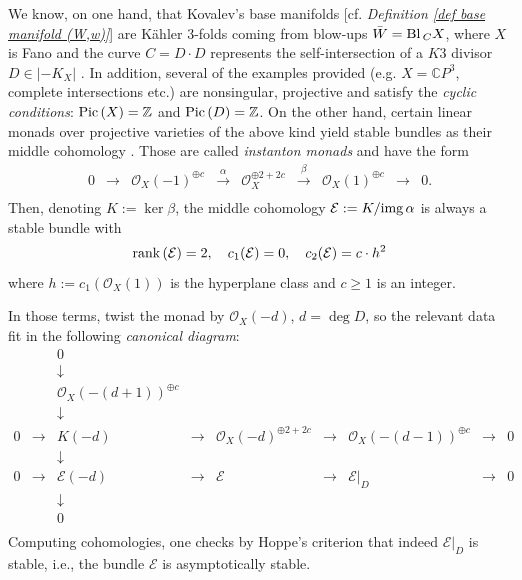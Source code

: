 \documentclass{article}
\newcommand{\func}[1]{\textnormal {#1\,}}
\newcommand{\oo}{\mathcal{O}_X}
\newcommand{\pic}{\func{Pic}}
\newcommand{\rank}{\func{rank}}
\newcommand{\img}{\func{img}}
\newcommand{\mc}[1]{\mathcal{#1}}
\begin{document}
We know, on one hand, that Kovalev's base manifolds [cf. \emph{Definition \ref{def base manifold (W,w)}}] are K\"ahler 3-folds
coming from blow-ups $\bar W=\func{Bl}_C X$, where $X$ is Fano and the curve $C=D\cdot D$ represents the self-intersection of a $K3$ divisor $D\in\left\vert -K_X \right\vert$ \cite[6.43]{kovalevzao}. In addition, several of the examples provided (e.g. $X=\mathbb{C}P^3$, complete intersections etc.) are nonsingular, projective and satisfy the \emph{cyclic conditions}: $\pic(X)=\mathbb{Z}$ and $\pic(D)=\mathbb{Z}$. 
On the other hand, certain linear monads over projective varieties of the above kind yield stable bundles as their middle cohomology \cite{Jardim Bull Braz}. Those are called \emph{instanton monads} and have the form
\begin{equation}        \label{eq instanton monad}
\begin{array}{ccccccccc}
0 & \rightarrow & \oo\left(-1\right)^{\oplus c} & \overset{\alpha}{\longrightarrow} & \oo^{\oplus2+2c} & \overset{\beta}{\longrightarrow} & \oo\left(1\right)^{\oplus c} & \rightarrow & 0.\\
\end{array}
\end{equation} Then,  denoting $K:=\ker\beta$,  the middle cohomology $\mc{E}:= K/\img \alpha$ is always a stable bundle with
        \begin{displaymath}
                \rank(\mc{E})=2,\quad c_1(\mc{E})=0, 
                \quad c_2(\mc{E})=c\cdot h^2
        \end{displaymath} 
where  $h:= c_1(\oo(1))$ is the hyperplane class and $c\geq1$ is an integer.

In those terms, twist the monad by $\oo(-d)$, $d=\deg D$, so the relevant data fit in the following \emph{canonical diagram}:
\begin{displaymath}
\begin{array}{ccccccccc}
  &  & 0 &  &  &  &  &  &  \\
  &  & \downarrow &  &  &  &  &  &  \\
  &  & \oo\left(-(d+1)\right)^{\oplus c} &  &  &  &  &  &  \\
  &  & \downarrow &  &  &  &  &  &  \\
0 & \rightarrow & K(-d) & \longrightarrow & \oo(-d)^{\oplus 2+2c} & \longrightarrow & \oo(-\left(d-1\right))^{\oplus c} & \rightarrow & 0 \\
 &  & \downarrow &  &  &  &  &  &  \\
0 & \rightarrow & \mc{E}(-d) & \longrightarrow & \mc{E} & \longrightarrow & \left.\mc{E}\right\vert_D & \rightarrow & 0 \\
 &  & \downarrow &  &  &  &  &  &  \\
 &  & 0 &  &  &  &  &  &  \\
\end{array}
\end{displaymath}
Computing cohomologies, one checks by Hoppe's criterion \cite[pp.165-166]{Okonek-Spindler-Schneider} that indeed $\left.\mc{E}\right\vert_D$ is stable, i.e., the bundle $\mc{E}$ is asymptotically stable. 
\end{document}
